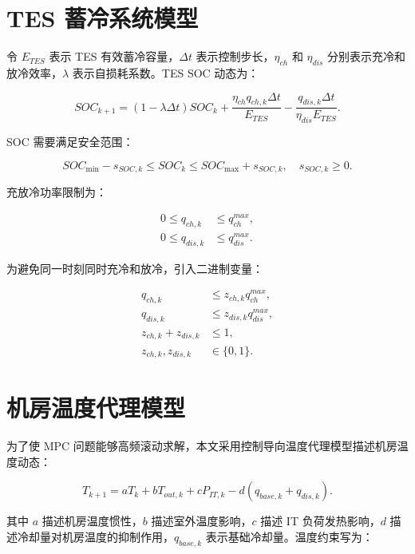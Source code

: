 \documentclass[UTF8,a4paper,12pt]{ctexrep}
\begin{document}
\section{TES 蓄冷系统模型}

令 $E_{TES}$ 表示 TES 有效蓄冷容量，$\Delta t$ 表示控制步长，$\eta_{ch}$ 和 $\eta_{dis}$ 分别表示充冷和放冷效率，$\lambda$ 表示自损耗系数。TES SOC 动态为：

\begin{equation}
  SOC_{k+1}
  =
  (1-\lambda \Delta t)SOC_k
  + \frac{\eta_{ch} q_{ch,k}\Delta t}{E_{TES}}
  - \frac{q_{dis,k}\Delta t}{\eta_{dis}E_{TES}}.
  \label{eq:soc}
\end{equation}

SOC 需要满足安全范围：

\begin{equation}
  SOC_{\min} - s_{SOC,k} \leq SOC_k \leq SOC_{\max} + s_{SOC,k}, \quad s_{SOC,k}\geq 0.
\end{equation}

充放冷功率限制为：

\begin{align}
  0 \leq q_{ch,k} &\leq q_{ch}^{max}, \\
  0 \leq q_{dis,k} &\leq q_{dis}^{max}.
\end{align}

为避免同一时刻同时充冷和放冷，引入二进制变量：

\begin{align}
  q_{ch,k} &\leq z_{ch,k}q_{ch}^{max}, \\
  q_{dis,k} &\leq z_{dis,k}q_{dis}^{max}, \\
  z_{ch,k}+z_{dis,k} &\leq 1, \\
  z_{ch,k},z_{dis,k} &\in \{0,1\}.
\end{align}

\section{机房温度代理模型}

为了使 MPC 问题能够高频滚动求解，本文采用控制导向温度代理模型描述机房温度动态：

\begin{equation}
  T_{k+1}
  =
  aT_k
  + bT_{out,k}
  + cP_{IT,k}
  - d(q_{base,k}+q_{dis,k}).
  \label{eq:temp}
\end{equation}

其中 $a$ 描述机房温度惯性，$b$ 描述室外温度影响，$c$ 描述 IT 负荷发热影响，$d$ 描述冷却量对机房温度的抑制作用，$q_{base,k}$ 表示基础冷却量。温度约束写为：
\end{document}
